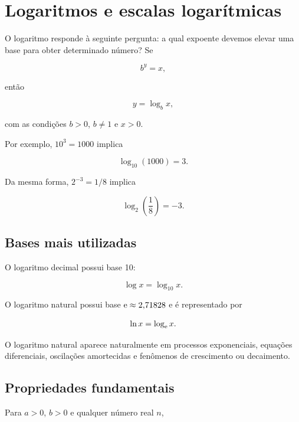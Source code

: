 \section{Logaritmos e escalas logarítmicas}

O logaritmo responde à seguinte pergunta: a qual expoente devemos elevar uma base para obter determinado número? Se

\begin{equation}
  b^y=x,
\end{equation}

então

\begin{equation}
  y=\log_bx,
\end{equation}

com as condições $b>0$, $b\neq1$ e $x>0$.

Por exemplo, $10^3=1000$ implica

\begin{equation}
  \log_{10}(1000)=3.
\end{equation}

Da mesma forma, $2^{-3}=1/8$ implica

\begin{equation}
  \log_2\left(\frac{1}{8}\right)=-3.
\end{equation}

\subsection{Bases mais utilizadas}

O logaritmo decimal possui base 10:

\begin{equation}
  \log x=\log_{10}x.
\end{equation}

O logaritmo natural possui base $\mathrm{e}\approx2{,}71828$ e é representado por

\begin{equation}
  \ln x=\log_{\mathrm{e}} x.
\end{equation}

O logaritmo natural aparece naturalmente em processos exponenciais, equações diferenciais, oscilações amortecidas e fenômenos de crescimento ou decaimento.

\subsection{Propriedades fundamentais}

Para $a>0$, $b>0$ e qualquer número real $n$,

